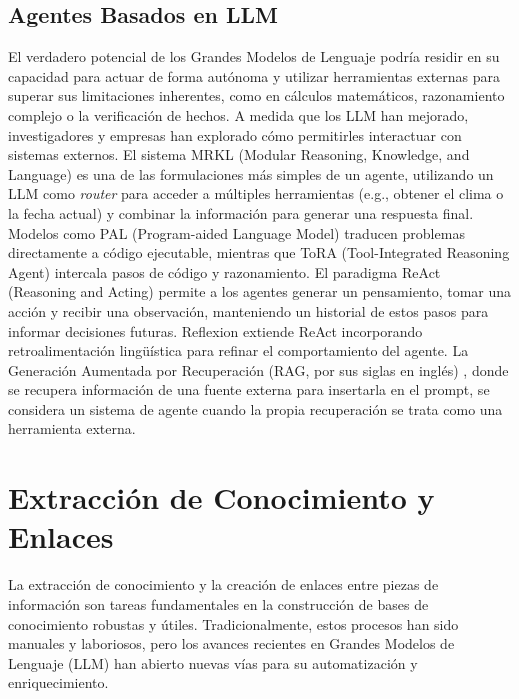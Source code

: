 \subsection{Agentes Basados en LLM}
\label{subsec:agentes_llm}
El verdadero potencial de los Grandes Modelos de Lenguaje podría residir en su capacidad para actuar de forma autónoma y utilizar herramientas externas para superar sus limitaciones inherentes, como en cálculos matemáticos, razonamiento complejo o la verificación de hechos. A medida que los LLM han mejorado, investigadores y empresas han explorado cómo permitirles interactuar con sistemas externos.
El sistema MRKL (Modular Reasoning, Knowledge, and Language) \parencite{karpasMRKLSystemsModular2022} es una de las formulaciones más simples de un agente, utilizando un LLM como \textit{router} para acceder a múltiples herramientas (e.g., obtener el clima o la fecha actual) y combinar la información para generar una respuesta final. Modelos como PAL (Program-aided Language Model) \parencite{gaoPALProgramaidedLanguage2023} traducen problemas directamente a código ejecutable, mientras que ToRA (Tool-Integrated Reasoning Agent) \parencite{gouToRAToolIntegratedReasoning2024} intercala pasos de código y razonamiento. El paradigma ReAct (Reasoning and Acting) \parencite{yaoReActSynergizingReasoning2023} permite a los agentes generar un pensamiento, tomar una acción y recibir una observación, manteniendo un historial de estos pasos para informar decisiones futuras. Reflexion \parencite{shinnReflexionLanguageAgents2023} extiende ReAct incorporando retroalimentación lingüística para refinar el comportamiento del agente. La Generación Aumentada por Recuperación (RAG, por sus siglas en inglés) \parencite{lewisRetrievalAugmentedGenerationKnowledgeIntensive2021}, donde se recupera información de una fuente externa para insertarla en el prompt, se considera un sistema de agente cuando la propia recuperación se trata como una herramienta externa.

\section{Extracción de Conocimiento y Enlaces}
\label{sec:extraccion_conocimiento_enlaces}
La extracción de conocimiento y la creación de enlaces entre piezas de información son tareas fundamentales en la construcción de bases de conocimiento robustas y útiles. Tradicionalmente, estos procesos han sido manuales y laboriosos, pero los avances recientes en Grandes Modelos de Lenguaje (LLM) han abierto nuevas vías para su automatización y enriquecimiento.

